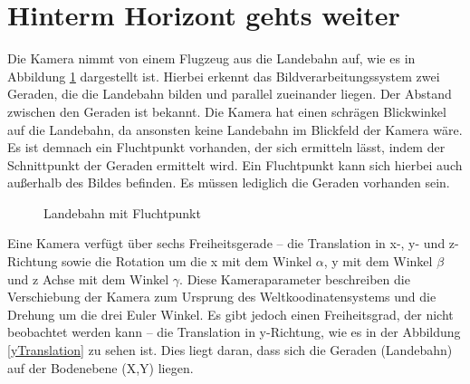 \documentclass{ezb}
\begin{document}
\section{Hinterm Horizont gehts weiter}
Die Kamera nimmt von einem Flugzeug aus die Landebahn auf, wie es in Abbildung \ref{landebahnAufgBild} dargestellt ist. Hierbei erkennt das Bildverarbeitungssystem zwei Geraden, die die Landebahn bilden und parallel zueinander liegen. Der Abstand zwischen den Geraden ist bekannt. Die Kamera hat einen schrägen Blickwinkel auf die Landebahn, da ansonsten keine Landebahn im Blickfeld der Kamera wäre. Es ist demnach ein Fluchtpunkt vorhanden, der sich ermitteln lässt, indem der Schnittpunkt der Geraden ermittelt wird. Ein Fluchtpunkt kann sich hierbei auch außerhalb des Bildes befinden. Es müssen lediglich die Geraden vorhanden sein.

\begin{figure}[htbp]
	\centering
	\caption{Landebahn mit Fluchtpunkt}
	\label{landebahnAufgBild}
\end{figure}

Eine Kamera verfügt über sechs Freiheitsgerade – die Translation in x-, y- und z-Richtung sowie die Rotation um die x mit dem Winkel $\alpha$, y mit dem Winkel $\beta$ und z Achse mit dem Winkel $\gamma$. Diese Kameraparameter beschreiben die Verschiebung  der Kamera zum Ursprung des Weltkoodinatensystems und die Drehung um die drei Euler Winkel. Es gibt jedoch einen Freiheitsgrad, der nicht beobachtet werden kann – die Translation in y-Richtung, wie es in der Abbildung \ref{yTranslation} zu sehen ist. Dies liegt daran, dass sich die Geraden (Landebahn) auf der Bodenebene (X,Y) liegen.
\end{document}

